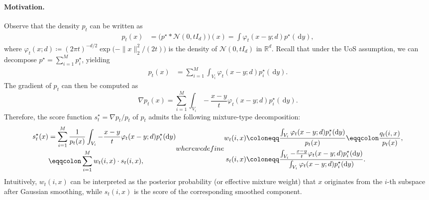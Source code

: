 \documentclass{article}
\newcommand{\defn}{\coloneqq}
\newcommand{\defnrev}{\eqqcolon}
\newcommand{\cN}{\mathcal{N}}
\newcommand{\bR}{\mathbb{R}}
\newcommand{\diff}{\,\mathrm{d}}
\theoremstyle{plain}
\theoremstyle{remark}
\begin{document}
\paragraph{Motivation.}
Observe that the density $p_t$ can be written as
\begin{align*}
    p_t(x) &= \big(p^\star \ast \cN(0, t I_d)\big)(x) =  \int \varphi_t(x-y;d) p^\star(\!\diff y),
\end{align*}
where $\varphi_t(x;d) \defn (2\pi t)^{-d/2}\exp\bigl(-\|x\|_2^2/(2t)\bigr)$ is the density of $\mathcal{N}(0,tI_d)$ in $\bR^d$.
Recall that under the UoS assumption, we can decompose $p^\star = \sum_{i=1}^M p_i^\star$, yielding
\begin{align*}
    p_t(x) &= \sum_{i=1}^M \int_{V_i} \varphi_t(x-y;d) p_i^\star( \!\diff y). 
\end{align*}
The gradient of $p_t$ can then be computed as
$$ \nabla p_t(x) = \sum_{i=1}^M \int_{V_i} -\frac{x-y}{t} \varphi_t(x-y;d) p_i^\star( \!\diff y) .$$
Therefore, the score function $s_t^\star = {\nabla p_t}/{p_t}$ of $p_t$ admits the following mixture-type decomposition:
\begin{subequations}\label{eq:score decomp}
\begin{align}
    s_t^\star(x) &= \sum_{i=1}^M \frac1{p_t(x)}\int_{V_i} -\frac{x-y}{t} \varphi_t(x-y;d) p_i^\star(\!\diff y) \notag\\
    & \defnrev \sum_{i=1}^M w_t(i,x) \cdot s_t(i,x),
\end{align}
where we define
\begin{align}
    w_t(i,x) &\defn \frac{\int_{V_i} \varphi_t(x-y;d) p_i^\star(\!\diff y)}{p_t(x)}\defnrev \frac{q_t(i,x)}{p_t(x)}, \label{eq:defn w_t(i,x)} \\
    s_t(i,x)&\defn \frac{\int_{V_i} -\frac{x-y}{t} \varphi_t(x-y;d) p_i^\star(\!\diff y)}{\int_{V_i} \varphi_t(x-y;d) p_i^\star(\!\diff y)} \label{eq:defn s_t(i,x)}.
\end{align}
\end{subequations}
Intuitively, $w_t(i,x)$ can be interpreted as the posterior probability (or effective mixture weight) that $x$ originates from the $i$-th subspace after Gaussian smoothing, while $s_t(i,x)$ is the score of the corresponding smoothed component.
\end{document}
